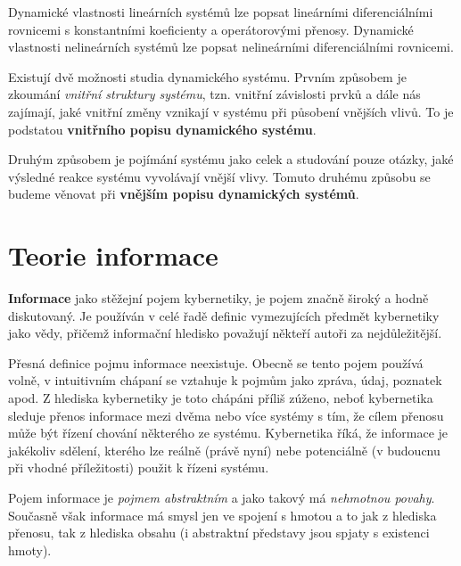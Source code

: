 {       Dynamické vlastnosti lineárních systémů lze popsat lineárními diferenciálními rovnicemi s 
       konstantními koeficienty a operátorovými přenosy. Dynamické vlastnosti nelineárních systémů 
       lze popsat nelineárními diferenciálními rovnicemi.
       
       Existují dvě možnosti studia dynamického systému. Prvním způsobem je zkoumání \emph{vnitřní 
       struktury systému}, tzn. vnitřní závislosti prvků a dále nás zajímají, jaké vnitřní změny 
       vznikají v systému při působení vnějších vlivů. To je podstatou \textbf{vnitřního popisu 
       dynamického systému}.
       
       Druhým způsobem je pojímání systému jako celek a studování pouze otázky, jaké výsledné 
       reakce systému vyvolávají vnější vlivy. Tomuto druhému způsobu se budeme věnovat při 
       \textbf{vnějším popisu dynamických systémů}.
     
     
  \section{Teorie informace}
    \textbf{Informace} jako stěžejní pojem kybernetiky, je pojem značně široký a hodně diskutovaný. 
    Je používán v celé řadě definic vymezujících předmět kybernetiky jako vědy, přičemž informační 
    hledisko považují někteří autoři za nejdůležitější.
      
    Přesná definice pojmu informace neexistuje. Obecně se tento pojem používá volně, v intuitivním 
    chápaní se vztahuje k pojmům jako zpráva, údaj, poznatek apod. Z hlediska kybernetiky je toto 
    chápáni příliš zúženo, neboť kybernetika sleduje přenos informace mezi dvěma nebo více systémy 
    s tím, že cílem přenosu může být řízení chování některého ze systému. Kybernetika říká, že 
    informace je jakékoliv sdělení, kterého lze reálně (právě nyní) nebe potenciálně (v budoucnu 
    při vhodné příležitosti) použit k řízeni systému.
    
    Pojem informace je \emph{pojmem abstraktním} a jako takový má \emph{nehmotnou povahy}. 
    Současně však informace má smysl jen ve spojení s hmotou a to jak z hlediska přenosu, tak z 
    hlediska obsahu (i abstraktní představy jsou spjaty s existenci hmoty).
    
}
